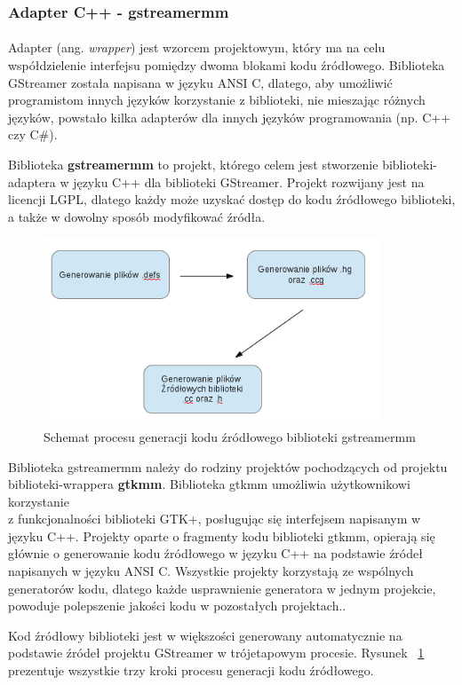 \documentclass[12pt]{article}
\begin{document}
\subsubsection{Adapter C++ - gstreamermm}
\paragraph{}
Adapter (ang. \textit{wrapper}) jest wzorcem projektowym, który ma na celu współdzielenie interfejsu pomiędzy dwoma blokami kodu źródłowego. Biblioteka GStreamer została napisana w języku ANSI C, dlatego, aby umożliwić programistom innych języków korzystanie z biblioteki, nie mieszając różnych języków, powstało kilka adapterów dla innych języków programowania (np. C++ czy C\#).

Biblioteka \textbf{gstreamermm} to projekt, którego celem jest stworzenie biblioteki-adaptera w języku C++ dla biblioteki GStreamer. Projekt rozwijany jest na licencji LGPL, dlatego każdy może uzyskać dostęp do kodu źródłowego biblioteki, a także w dowolny sposób modyfikować źródła.
\begin{figure}[H]
  \includegraphics[width=100mm]{img/mm-generate-process.png}
  \caption{Schemat procesu generacji kodu źródłowego biblioteki gstreamermm}
  \label{fig:mmGenerateProcess}
\end{figure}
Biblioteka gstreamermm należy do rodziny projektów pochodzących od projektu biblioteki-wrappera \textbf{gtkmm}. Biblioteka gtkmm umożliwia użytkownikowi korzystanie \\z funkcjonalności biblioteki GTK+, posługując się interfejsem napisanym w języku C++. Projekty oparte o fragmenty kodu biblioteki gtkmm, opierają się głównie o generowanie kodu źródłowego w języku C++ na podstawie źródeł napisanych w języku ANSI C. Wszystkie projekty korzystają ze wspólnych generatorów kodu, dlatego każde usprawnienie generatora w jednym projekcie, powoduje polepszenie jakości kodu w pozostałych projektach..

Kod źródłowy biblioteki jest w większości generowany automatycznie na podstawie źródeł projektu GStreamer w trójetapowym procesie. Rysunek ~\ref{fig:mmGenerateProcess} prezentuje wszystkie trzy kroki procesu generacji kodu źródłowego.
\end{document}
